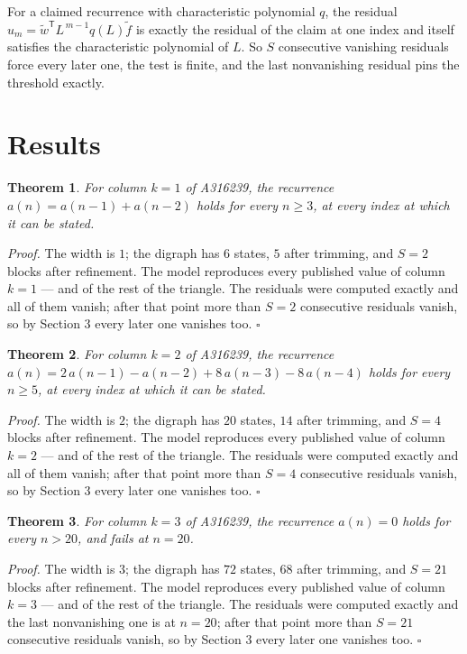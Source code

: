 \documentclass[11pt]{article}
\newtheorem{theorem}{Theorem}
\theoremstyle{definition}
\begin{document}
For a claimed recurrence with characteristic polynomial $q$, the residual $u_m = \tilde w^{\mathsf T}L^{\,m-1}q(L)\tilde f$ is exactly the residual of the claim at one index and itself satisfies the characteristic polynomial of $L$. So $S$ consecutive vanishing residuals force every later one, the test is finite, and the last nonvanishing residual pins the threshold exactly.

\section{Results}

\begin{theorem} For column $k = 1$ of A316239, the recurrence $a(n) = a(n-1) + a(n-2)$ holds for every $n \ge 3$, at every index at which it can be stated.\end{theorem}

{\itshape Proof.} The width is $1$; the digraph has $6$ states, $5$ after trimming, and $S = 2$ blocks after refinement. The model reproduces every published value of column $k = 1$ --- and of the rest of the triangle. The residuals were computed exactly and all of them vanish; after that point more than $S = 2$ consecutive residuals vanish, so by Section 3 every later one vanishes too. $\square$

\begin{theorem} For column $k = 2$ of A316239, the recurrence $a(n) = 2\,a(n-1) - a(n-2) + 8\,a(n-3) - 8\,a(n-4)$ holds for every $n \ge 5$, at every index at which it can be stated.\end{theorem}

{\itshape Proof.} The width is $2$; the digraph has $20$ states, $14$ after trimming, and $S = 4$ blocks after refinement. The model reproduces every published value of column $k = 2$ --- and of the rest of the triangle. The residuals were computed exactly and all of them vanish; after that point more than $S = 4$ consecutive residuals vanish, so by Section 3 every later one vanishes too. $\square$

\begin{theorem} For column $k = 3$ of A316239, the recurrence $a(n) = 0$ holds for every $n > 20$, and fails at $n = 20$.\end{theorem}

{\itshape Proof.} The width is $3$; the digraph has $72$ states, $68$ after trimming, and $S = 21$ blocks after refinement. The model reproduces every published value of column $k = 3$ --- and of the rest of the triangle. The residuals were computed exactly and the last nonvanishing one is at $n = 20$; after that point more than $S = 21$ consecutive residuals vanish, so by Section 3 every later one vanishes too. $\square$
\end{document}
